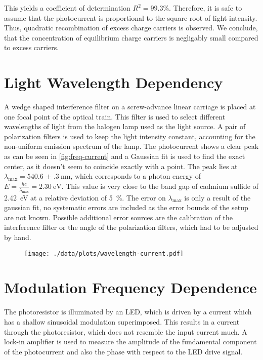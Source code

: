 This yields a coefficient of determination $R^2 = 99.3\%$.
Therefore, it is safe to assume that the photocurrent is proportional to the square root of light intensity.
Thus, quadratic recombination of excess charge carriers is observed.
We conclude, that the concentration of equilibrium charge carriers is negligably small compared to excess carriers.

\section{Light Wavelength Dependency}
A wedge shaped interference filter on a screw-advance linear carriage is placed at one focal point of the optical train.
This filter is used to select different wavelengths of light from the halogen lamp used as the light source.
A pair of polarization filters is used to keep the light intensity constant, accounting for the non-uniform emission spectrum of the lamp.
The photocurrent shows a clear peak as can be seen in \autoref{fig:freq-current} and a Gaussian fit is used to find the exact center, as it doesn't seem to coincide exactly with a point.
The peak lies at $\lambda_\text{max} = \SI{540.6(3)}{\nano\meter}$, which corresponds to a photon energy of $E = \frac{h c}{\lambda_\text{max}} = \SI{2.30}{\electronvolt}$.
This value is very close to the band gap of cadmium sulfide of \SI{2.42}{\electronvolt} at a relative deviation of \SI{5}{\percent}.
The error on $\lambda_\text{max}$ is only a result of the gaussian fit, no systematic errors are included as the error bounds of the setup are not known.
Possible additional error sources are the calibration of the interference filter or the angle of the polarization filters, which had to be adjusted by hand.
\begin{figure}
	\centering
	\texttt{[image: ./data/plots/wavelength-current.pdf]}
	\label{fig:freq-current}
\end{figure}

\section{Modulation Frequency Dependence}
The photoresistor is illuminated by an LED, which is driven by a current which has a shallow sinusoidal modulation superimposed.
This results in a current through the photoresistor, which does not resemble the input current much.
A lock-in amplifier is used to measure the amplitude of the fundamental component of the photocurrent and also the phase with respect to the LED drive signal.

